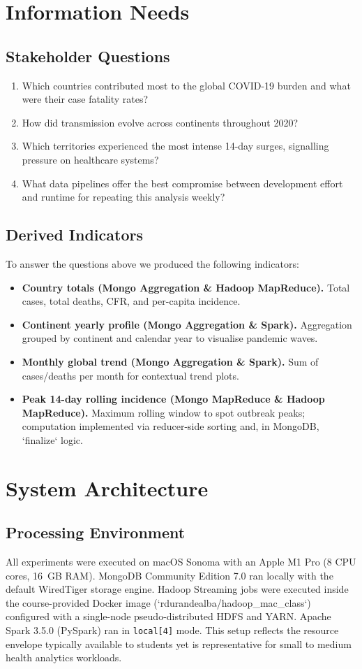 \documentclass[12pt, a4paper]{article}
\begin{document}
\section{Information Needs}
\subsection{Stakeholder Questions}
\begin{enumerate}[leftmargin=1.2cm]
    \item Which countries contributed most to the global COVID-19 burden and what were their case fatality rates?
    \item How did transmission evolve across continents throughout 2020?
    \item Which territories experienced the most intense 14-day surges, signalling pressure on healthcare systems?
    \item What data pipelines offer the best compromise between development effort and runtime for repeating this analysis weekly?
\end{enumerate}

\subsection{Derived Indicators}
To answer the questions above we produced the following indicators:
\begin{itemize}[leftmargin=1.2cm]
    \item \textbf{Country totals (Mongo Aggregation \& Hadoop MapReduce).} Total cases, total deaths, CFR, and per-capita incidence.
    \item \textbf{Continent yearly profile (Mongo Aggregation \& Spark).} Aggregation grouped by continent and calendar year to visualise pandemic waves.
    \item \textbf{Monthly global trend (Mongo Aggregation \& Spark).} Sum of cases/deaths per month for contextual trend plots.
    \item \textbf{Peak 14-day rolling incidence (Mongo MapReduce \& Hadoop MapReduce).} Maximum rolling window to spot outbreak peaks; computation implemented via reducer-side sorting and, in MongoDB, `finalize` logic.
\end{itemize}

\section{System Architecture}
\subsection{Processing Environment}
All experiments were executed on macOS Sonoma with an Apple M1 Pro (8 CPU cores, 16~GB RAM). MongoDB Community Edition 7.0 ran locally with the default WiredTiger storage engine. Hadoop Streaming jobs were executed inside the course-provided Docker image (`rdurandealba/hadoop_mac_class`) configured with a single-node pseudo-distributed HDFS and YARN. Apache Spark 3.5.0 (PySpark) ran in \texttt{local[4]} mode. This setup reflects the resource envelope typically available to students yet is representative for small to medium health analytics workloads.
\end{document}
